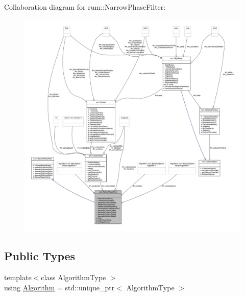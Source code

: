 Collaboration diagram for rum\+:\+:Narrow\+Phase\+Filter\+:\nopagebreak
\begin{figure}[H]
\begin{center}
\leavevmode
\includegraphics[width=350pt]{classrum_1_1_narrow_phase_filter__coll__graph}
\end{center}
\end{figure}
\subsection*{Public Types}
\begin{DoxyCompactItemize}
\item 
{\footnotesize template$<$class Algorithm\+Type $>$ }\\using \mbox{\hyperlink{classrum_1_1_narrow_phase_filter_a499acd63e16f164dbf1ee7567c1a3e0f}{Algorithm}} = std\+::unique\+\_\+ptr$<$ Algorithm\+Type $>$
\end{DoxyCompactItemize}
